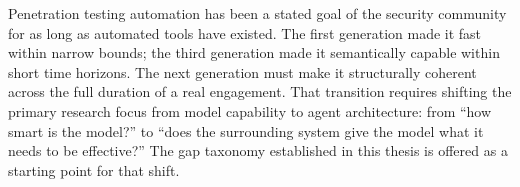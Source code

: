 \documentclass[12pt,a4paper,oneside,openany]{book}
\begin{document}
Penetration testing automation has been a stated goal of the security community for as long as automated tools have existed. The first generation made it fast within narrow bounds; the third generation made it semantically capable within short time horizons. The next generation must make it structurally coherent across the full duration of a real engagement. That transition requires shifting the primary research focus from model capability to agent architecture: from ``how smart is the model?'' to ``does the surrounding system give the model what it needs to be effective?'' The gap taxonomy established in this thesis is offered as a starting point for that shift.



\end{document}
